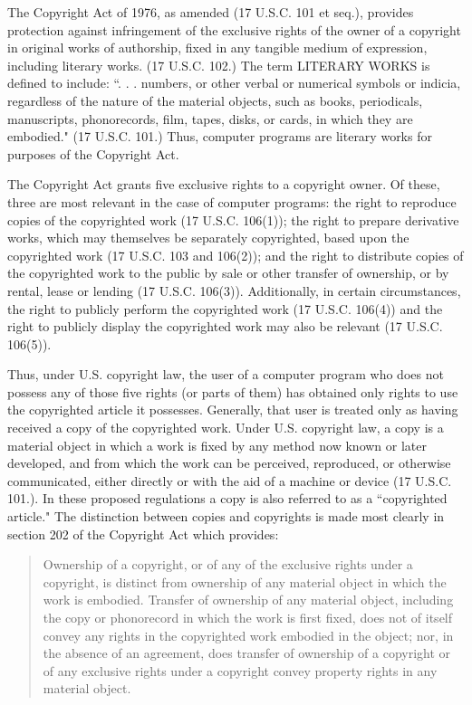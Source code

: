 \begin{select}
The Copyright Act of 1976, as amended (17 U.S.C. 101 et seq.), provides protection against infringement of the exclusive rights of the owner of a copyright in original works of authorship, fixed in any tangible medium of expression, including literary works. (17 U.S.C. 102.) The term LITERARY WORKS is defined to include: ``. . . numbers, or other verbal or numerical symbols or indicia, regardless of the nature of the material objects, such as books, periodicals, manuscripts, phonorecords, film, tapes, disks, or cards, in which they are embodied." (17 U.S.C. 101.) Thus, computer programs are literary works for purposes of the Copyright Act.

The Copyright Act grants five exclusive rights to a copyright owner. Of these, three are most relevant in the case of computer programs: the right to reproduce copies of the copyrighted work (17 U.S.C. 106(1)); the right to prepare derivative works, which may themselves be separately copyrighted, based upon the copyrighted work (17 U.S.C. 103 and 106(2)); and the right to distribute copies of the copyrighted work to the public by sale or other transfer of ownership, or by rental, lease or lending (17 U.S.C. 106(3)). Additionally, in certain circumstances, the right to publicly perform the copyrighted work (17 U.S.C. 106(4)) and the right to publicly display the copyrighted work may also be relevant (17 U.S.C. 106(5)).

Thus, under U.S. copyright law, the user of a computer program who does not possess any of those five rights (or parts of them) has obtained only rights to use the copyrighted article it possesses. Generally, that user is treated only as having received a copy of the copyrighted work. Under U.S. copyright law, a copy is a material object in which a work is fixed by any method now known or later developed, and from which the work can be perceived, reproduced, or otherwise communicated, either directly or with the aid of a machine or device (17 U.S.C. 101.). In these proposed regulations a copy is also referred to as a ``copyrighted article." The distinction between copies and copyrights is made most clearly in section 202 of the Copyright Act which provides:

\begin{quote}
Ownership of a copyright, or of any of the exclusive rights
under a copyright, is distinct from ownership of any material
object in which the work is embodied. Transfer of ownership of
any material object, including the copy or phonorecord in which
the work is first fixed, does not of itself convey any rights in
the copyrighted work embodied in the object; nor, in the absence
of an agreement, does transfer of ownership of a copyright or of
any exclusive rights under a copyright convey property rights in
any material object.
\end{quote}


\end{select}
